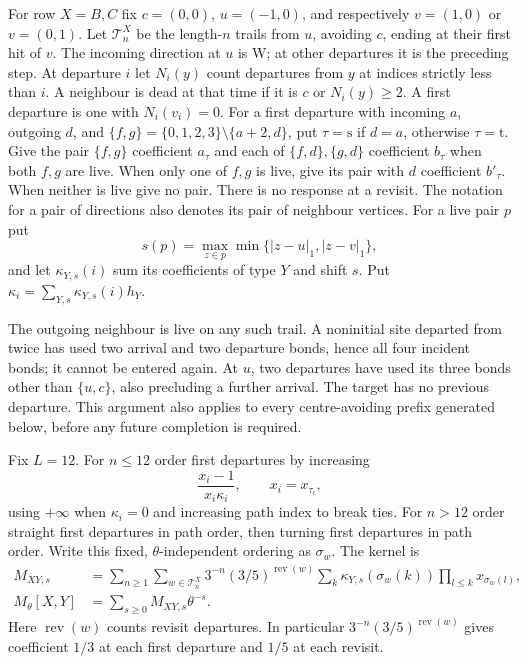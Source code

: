For row $X=B,C$ fix $c=(0,0)$, $u=(-1,0)$, and respectively
$v=(1,0)$ or $v=(0,1)$.  Let $\mathcal T_n^X$ be the length-$n$
trails from $u$, avoiding $c$, ending at their first hit of $v$.
The incoming direction at $u$ is W; at other departures it is the
preceding step.  At departure $i$ let $N_i(y)$ count departures from
$y$ at indices strictly less than $i$.  A neighbour is dead at that
time if it is $c$ or $N_i(y)\ge2$.  A first departure is one with
$N_i(v_i)=0$.  For a first departure with incoming $a$, outgoing $d$,
and $\{f,g\}=\{0,1,2,3\}\setminus\{a+2,d\}$, put $\tau=\mathrm s$
if $d=a$, otherwise $\tau=\mathrm t$.  Give the pair $\{f,g\}$
coefficient $a_\tau$ and each of $\{f,d\},\{g,d\}$ coefficient
$b_\tau$ when both $f,g$ are live.  When only one of $f,g$ is live,
give its pair with $d$ coefficient $b'_\tau$.  When neither is live
give no pair.  There is no response at a revisit.  The notation for a
pair of directions also denotes its pair of neighbour vertices.
For a live pair $p$ put
\[
 s(p)=\max_{z\in p}\min\{|z-u|_1,|z-v|_1\},
\]
and let $\kappa_{Y,s}(i)$ sum its coefficients of type $Y$ and shift
$s$.  Put $\kappa_i=\sum_{Y,s}\kappa_{Y,s}(i)h_Y$.

The outgoing neighbour is live on any such trail.  A noninitial site
departed from twice has used two arrival and two departure bonds, hence
all four incident bonds; it cannot be entered again.  At $u$, two
departures have used its three bonds other than $\{u,c\}$, also
precluding a further arrival.  The target has no previous departure.
This argument also applies to every centre-avoiding prefix generated
below, before any future completion is required.

Fix $L=12$.  For $n\le12$ order first departures by increasing
\begin{equation}\label{hl:order}
 \frac{x_i-1}{x_i\kappa_i},\qquad x_i=x_{\tau_i},
\end{equation}
using $+\infty$ when $\kappa_i=0$ and increasing path index to break
ties.  For $n>12$ order straight first departures in path order,
then turning first departures in path order.  Write this fixed,
$\theta$-independent ordering as $\sigma_w$.  The kernel is
\begin{equation}\label{hl:kernel}
\begin{split}
 M_{XY,s}&=\sum_{n\ge1}\sum_{w\in\mathcal T_n^X}
   3^{-n}(3/5)^{\operatorname{rev}(w)}
   \sum_k\kappa_{Y,s}(\sigma_w(k))
                      \prod_{l\le k}x_{\sigma_w(l)},\\
 M_\theta[X,Y]&=\sum_{s\ge0}M_{XY,s}\theta^{-s}.
\end{split}
\end{equation}
Here $\operatorname{rev}(w)$ counts revisit departures.  In particular
$3^{-n}(3/5)^{\operatorname{rev}(w)}$ gives coefficient $1/3$ at
each first departure and $1/5$ at each revisit.

